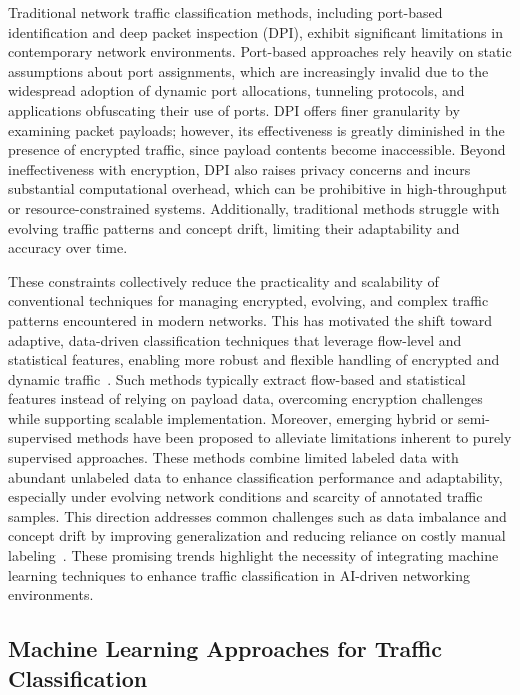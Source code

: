 \documentclass[sigconf]{acmart}
\begin{document}
Traditional network traffic classification methods, including port-based identification and deep packet inspection (DPI), exhibit significant limitations in contemporary network environments. Port-based approaches rely heavily on static assumptions about port assignments, which are increasingly invalid due to the widespread adoption of dynamic port allocations, tunneling protocols, and applications obfuscating their use of ports. DPI offers finer granularity by examining packet payloads; however, its effectiveness is greatly diminished in the presence of encrypted traffic, since payload contents become inaccessible. Beyond ineffectiveness with encryption, DPI also raises privacy concerns and incurs substantial computational overhead, which can be prohibitive in high-throughput or resource-constrained systems. Additionally, traditional methods struggle with evolving traffic patterns and concept drift, limiting their adaptability and accuracy over time.

These constraints collectively reduce the practicality and scalability of conventional techniques for managing encrypted, evolving, and complex traffic patterns encountered in modern networks. This has motivated the shift toward adaptive, data-driven classification techniques that leverage flow-level and statistical features, enabling more robust and flexible handling of encrypted and dynamic traffic~\cite{ref51}. Such methods typically extract flow-based and statistical features instead of relying on payload data, overcoming encryption challenges while supporting scalable implementation. Moreover, emerging hybrid or semi-supervised methods have been proposed to alleviate limitations inherent to purely supervised approaches. These methods combine limited labeled data with abundant unlabeled data to enhance classification performance and adaptability, especially under evolving network conditions and scarcity of annotated traffic samples. This direction addresses common challenges such as data imbalance and concept drift by improving generalization and reducing reliance on costly manual labeling~\cite{ref51}. These promising trends highlight the necessity of integrating machine learning techniques to enhance traffic classification in AI-driven networking environments.

\subsection{Machine Learning Approaches for Traffic Classification}
\end{document}
